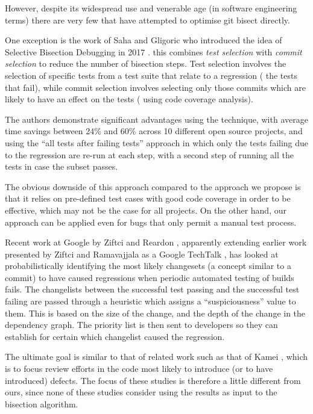 \documentclass[10pt,journal,compsoc]{IEEEtran}
\begin{document}
However, despite its widespread use and venerable age (in software engineering terms) there are very few that have attempted to optimise {\code git bisect} directly.

One exception is the work of Saha and Gligoric who introduced the idea of Selective Bisection Debugging in 2017 \cite{saha2017}. this combines {\it test selection\/} with {\it commit selection\/} to reduce the number of bisection steps. Test selection involves the selection of specific tests from a test suite that relate to a regression (\ie\/ the tests that fail), while commit selection involves selecting only those commits which are likely to have an effect on the tests (\eg\/ using code coverage analysis).

The authors demonstrate significant advantages using the technique, with average time savings between 24\% and 60\% across 10 different open source projects, and using the ``all tests after failing tests'' approach in which only the tests failing due to the regression are re-run at each step, with a second step of running all the tests in case the subset passes.

The obvious downside of this approach compared to the approach we propose is that it relies on pre-defined test cases with good code coverage in order to be effective, which may not be the case for all projects. On the other hand, our approach can be applied even for bugs that only permit a manual test process.

Recent work at Google by Ziftci and Reardon \cite{ziftci2017}, apparently extending earlier work presented by Ziftci and Ramavajjala as a Google TechTalk \cite{ziftci2013}, has looked at probabilistically identifying the most likely changesets (a concept similar to a commit) to have caused regressions when periodic automated testing of builds fails. The changelists between the successful test passing and the successful test failing are passed through a heuristic which assigns a ``suspiciousness'' value to them. This is based on the size of the change, and the depth of the change in the dependency graph. The priority list is then sent to developers so they can establish for certain which changelist caused the regression. 

The ultimate goal is similar to that of related work such as that of Kamei \etal, which is to focus review efforts in the code most likely to introduce (or to have introduced) defects. The focus of these studies is therefore a little different from ours, since none of these studies consider using the results as input to the bisection algorithm.
\end{document}
